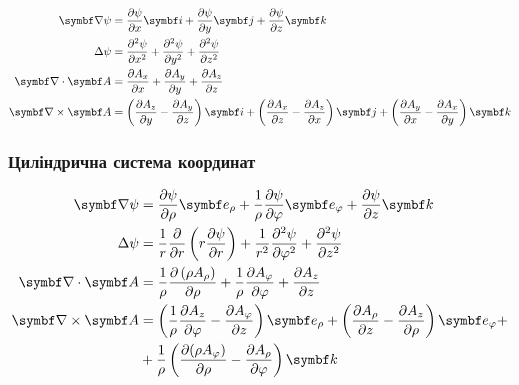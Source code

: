 \begin{align}\label{cartesian}
	\vect{\nabla}\psi & = \frac{\partial \psi}{\partial x} \vect{i} + \frac{\partial \psi}{\partial y} \vect{j} + \frac{\partial \psi}{\partial z} \vect{k} \\
	\Laplasian\psi    & = \frac{\partial^2 \psi}{\partial x^2} + \frac{\partial^2 \psi}{\partial y^2} + \frac{\partial^2 \psi }{\partial z^2}               \\
	\divg\vect{A}     & = \frac{\partial A_x}{\partial x}  + \frac{\partial A_y}{\partial y} + \frac{\partial A_z}{\partial z}                              \\
	\rot\vect{A}      & = \left( \frac{\partial A_z}{\partial y}  - \frac{\partial A_y}{\partial z}\right)  \vect{i} +
	\left( \frac{\partial A_x}{\partial z}  - \frac{\partial A_z}{\partial x}\right)  \vect{j} +
	\left( \frac{\partial A_y}{\partial x}  - \frac{\partial A_x}{\partial y}\right)  \vect{k}
\end{align}

\subsubsection{Циліндрична система координат}

\begin{align}\label{cylindric}
	\vect{\nabla}\psi & = \frac{\partial \psi}{\partial \rho} \vect{e}_{\rho} + \frac{1}{\rho}\frac{\partial \psi}{\partial \phi} \vect{e}_{\phi} + \frac{\partial \psi}{\partial z} \vect{k}                                                                                            \\
	\Laplasian\psi    & = \frac{1}{r} \frac{\partial }{\partial r} \left( r \frac{\partial \psi}{\partial r} \right) + \frac{1}{r^2} \frac{\partial^2 \psi}{\partial \varphi^2} + \frac{\partial^2 \psi}{\partial z^2}                                                                   \\
	\divg\vect{A}     & = \frac{1}{\rho}\frac{\partial \left(\rho A_{\rho }\right)}{\partial \rho }+\frac{1}{\rho }\frac{\partial A_{\varphi } }{\partial \varphi }+\frac{\partial A_{z}}{\partial z}                                                                                    \\
	\rot\vect{A}      & =\left({\frac {1}{\rho }}{\frac {\partial A_{z}}{\partial \varphi }}-{\frac {\partial A_{\varphi }}{\partial z}}\right)\vect{e}_{\rho}+\left({\frac {\partial A_{\rho }}{\partial z}}-{\frac {\partial A_{z}}{\partial \rho }}\right)\vect{e}_{\phi} + \nonumber \\
	                  & +
	{\frac {1}{\rho }}\left({\frac {\partial (\rho A_{\varphi })}{\partial \rho }}-{\frac {\partial A_{\rho }}{\partial \varphi }}\right)\vect{k}
\end{align}

